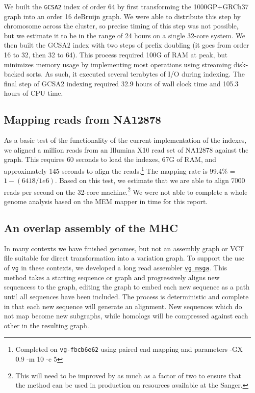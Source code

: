 \documentclass{article}
\begin{document}
We built the {\tt GCSA2} index of order 64 by first transforming the 1000GP+GRCh37 graph into an order 16 deBruijn graph.
We were able to distribute this step by chromosome across the cluster, so precise timing of this step was not possible, but we estimate it to be in the range of 24 hours on a single 32-core system.
We then built the GCSA2 index with two steps of prefix doubling (it goes from order 16 to 32, then 32 to 64).
This process required 100G of RAM at peak, but minimizes memory usage by implementing most operations using streaming disk-backed sorts.
As such, it executed several terabytes of I/O during indexing.
The final step of GCSA2 indexing required 32.9 hours of wall clock time and 105.3 hours of CPU time.

\subsection{Mapping reads from NA12878}

As a basic test of the functionality of the current implementation of the indexes, we aligned a million reads from an Illumina X10 read set of NA12878 against the graph.
This requires 60 seconds to load the indexes, 67G of RAM, and approximately 145 seconds to align the reads.\footnote{Completed on {\tt vg-fbcb6e62} using paired end mapping and parameters -GX 0.9 -m 10 -c 5}
The mapping rate is 99.4\% = $1 - (6418 / 1e6)$.
Based on this test, we estimate that we are able to align 7000 reads per second on the 32-core machine.\footnote{This will need to be improved by as much as a factor of two to ensure that the method can be used in production on resources available at the Sanger.}
We were not able to complete a whole genome analysis based on the MEM mapper in time for this report.

\subsection{An overlap assembly of the MHC}

In many contexts we have finished genomes, but not an assembly graph or VCF file suitable for direct transformation into a variation graph. 
To support the use of {\tt vg} in these contexts,
we developed a long read assembler \href{https://github.com/vgteam/vg/wiki/Long-read-assemblies-using-vg-msga}{\tt vg msga}.
This method takes a starting sequence or graph and progressively aligns new sequencess to the graph, editing the graph to embed each new sequence as a path until all sequences have been included.
The process is deterministic and complete in that each new sequence will generate an alignment.
New sequences which do not map become new subgraphs, while homologs will be compressed against each other in the resulting graph.
\end{document}
